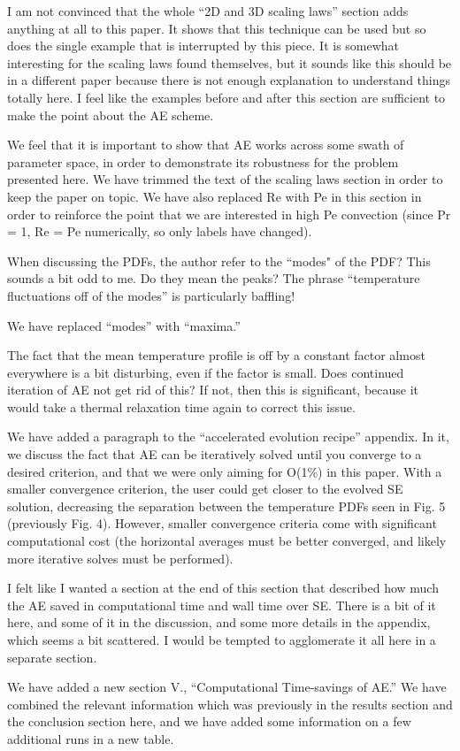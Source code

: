 \documentclass[aps, 11pt, singlecolumn]{revtex4-1} %
\begin{document}
\begin{singlespace}
\begin{myquotation}
I am not convinced that the whole ``2D and 3D scaling laws'' section
adds anything at all to this paper. It shows that this technique can
be used but so does the single example that is interrupted by this
piece. It is somewhat interesting for the scaling laws found
themselves, but it sounds like this should be in a different paper
because there is not enough explanation to understand things totally
here. I feel like the examples before and after this section are
sufficient to make the point about the AE scheme.
\end{myquotation}
We feel that it is important to show that AE works across some swath of parameter
space, in order to demonstrate its robustness for the problem presented here.
We have trimmed the text of the scaling laws section in
order to keep the paper on topic. We have also replaced Re with Pe in this
section in order to reinforce the point that we are interested in high Pe
convection (since Pr = 1, Re = Pe numerically, so only labels have changed).

\begin{myquotation}
When discussing the PDFs, the author refer to the ``modes" of the PDF?
This sounds a bit odd to me. Do they mean the peaks? The phrase
``temperature fluctuations off of the modes'' is particularly baffling!
\end{myquotation}
We have replaced ``modes'' with ``maxima.''

\begin{myquotation}
The fact that the mean temperature profile is off by a constant factor
almost everywhere is a bit disturbing, even if the factor is small.
Does continued iteration of AE not get rid of this? If not, then this
is significant, because it would take a thermal relaxation time again
to correct this issue.
\end{myquotation}
We have added a paragraph to the ``accelerated evolution recipe'' appendix.
In it, we discuss the fact that AE can be iteratively solved until you converge
to a desired criterion, and that we were only aiming for O(1\%) in this
paper. With a smaller convergence criterion, the user
could get closer to the evolved SE solution, decreasing the separation
between the temperature PDFs seen in Fig. 5 (previously Fig. 4). 
However, smaller convergence criteria
come with significant computational cost (the horizontal averages must be
better converged, and likely more iterative solves must be performed). 

\begin{myquotation}
I felt like I wanted a section at the end of this section that
described how much the AE saved in computational time and wall time
over SE. There is a bit of it here, and some of it in the discussion,
and some more details in the appendix, which seems a bit scattered. I
would be tempted to agglomerate it all here in a separate section.
\end{myquotation}
We have added a new section V., ``Computational Time-savings of AE.''
We have combined the relevant information which was previously in the results 
section and the conclusion section here, 
and we have added some information on a few
additional runs in a new table. 


\end{singlespace}
\end{document}

